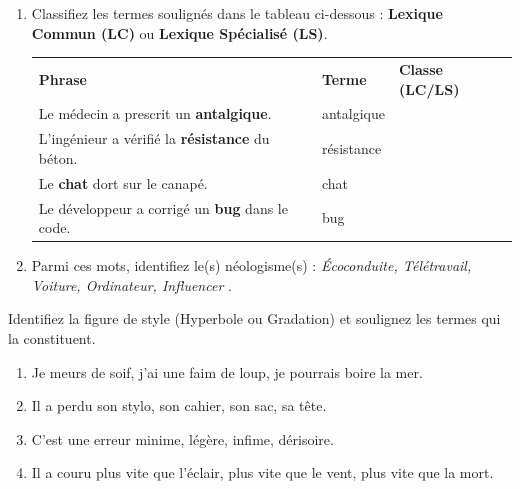 \documentclass[11pt]{article}
\begin{document}
\begin{exercice}
\begin{enumerate}
    \item Classifiez les termes soulignés dans le tableau ci-dessous : \textbf{Lexique Commun (LC)} ou \textbf{Lexique Spécialisé (LS)}.
    \begin{tabularx}{\linewidth}{>{\hsize=1.2\hsize}X >{\hsize=1.8\hsize}X >{\hsize=1\hsize}X}
        \textbf{Phrase} & \textbf{Terme} & \textbf{Classe (LC/LS)} \\
        Le médecin a prescrit un \textbf{antalgique}. & antalgique & \\
        L'ingénieur a vérifié la \textbf{résistance} du béton. & résistance & \\
        Le \textbf{chat} dort sur le canapé. & chat & \\
        Le développeur a corrigé un \textbf{bug} dans le code. & bug & \\
    \end{tabularx}
    \item Parmi ces mots, identifiez le(s) néologisme(s) : \og \textit{Écoconduite, Télétravail, Voiture, Ordinateur, Influencer} \fg.
\end{enumerate}
\end{exercice}

\begin{exercice}
Identifiez la figure de style (Hyperbole ou Gradation) et soulignez les termes qui la constituent.
\begin{enumerate}
    \item \og Je meurs de soif, j'ai une faim de loup, je pourrais boire la mer. \fg
    \item \og Il a perdu son stylo, son cahier, son sac, sa tête. \fg
    \item \og C'est une erreur minime, légère, infime, dérisoire. \fg
    \item \og Il a couru plus vite que l'éclair, plus vite que le vent, plus vite que la mort. \fg
\end{enumerate}
\end{exercice}
\end{document}
